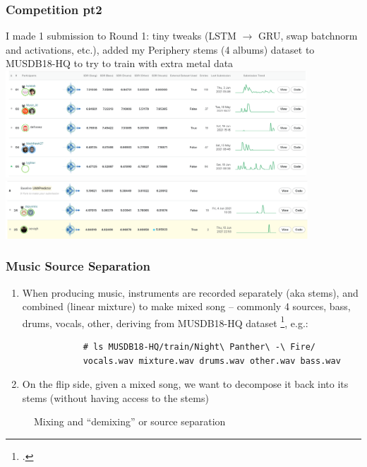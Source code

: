 \documentclass[usenames,dvipsnames]{beamer}
\begin{document}
\begin{frame}
	\frametitle{Competition pt2}
	I made 1 submission to Round 1: tiny tweaks (LSTM $\rightarrow$ GRU, swap batchnorm and activations, etc.), added my Periphery stems (4 albums) dataset to MUSDB18-HQ to try to train with extra metal data\\
	\includegraphics[height=4cm]{./top5.png}
	\includegraphics[height=2.17cm]{./currentplace.png}
\end{frame}

\begin{frame}[fragile]
	\frametitle{Music Source Separation}
	\begin{enumerate}
		\item
			When producing music, instruments are recorded separately (aka stems), and combined (linear mixture) to make mixed song -- commonly 4 sources, bass, drums, vocals, other, deriving from MUSDB18-HQ dataset \footcite{musdb18hq}, e.g.:
			\begin{verbatim}
			# ls MUSDB18-HQ/train/Night\ Panther\ -\ Fire/
			vocals.wav mixture.wav drums.wav other.wav bass.wav
			\end{verbatim}
		\item
			On the flip side, given a mixed song, we want to decompose it back into its stems (without having access to the stems)
	\end{enumerate}
	\begin{figure}[ht]
		\centering
		\hspace{0.1em}
		\caption{Mixing and ``demixing'' or source separation}
	\end{figure}
\end{frame}
\end{document}
